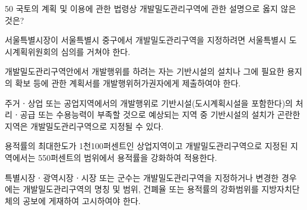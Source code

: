 \begin{question}{50}
국토의 계획 및 이용에 관한 법령상 개발밀도관리구역에 관한 설명으로 옳지 않은 것은?
\begin{choices}
  \item 서울특별시장이 서울특별시 중구에서 개발밀도관리구역을 지정하려면 서울특별시 도시계획위원회의 심의를 거쳐야 한다.
  \item 개발밀도관리구역안에서 개발행위를 하려는 자는 기반시설의 설치나 그에 필요한 용지의 확보 등에 관한 계획서를 개발행위허가권자에게 제출하여야 한다.
  \item 주거ㆍ상업 또는 공업지역에서의 개발행위로 기반시설(도시계획시설을 포함한다)의 처리ㆍ공급 또는 수용능력이 부족할 것으로 예상되는 지역 중 기반시설의 설치가 곤란한 지역은 개발밀도관리구역으로 지정될 수 있다.
  \item 용적률의 최대한도가 1천100퍼센트인 상업지역이고 개발밀도관리구역으로 지정된 지역에서는 550퍼센트의 범위에서 용적률을 강화하여 적용한다.
  \item 특별시장ㆍ광역시장ㆍ시장 또는 군수는 개발밀도관리구역을 지정하거나 변경한 경우에는 개발밀도관리구역의 명칭 및 범위, 건폐율 또는 용적률의 강화범위를 지방자치단체의 공보에 게재하여 고시하여야 한다.
\end{choices}
\end{question}
